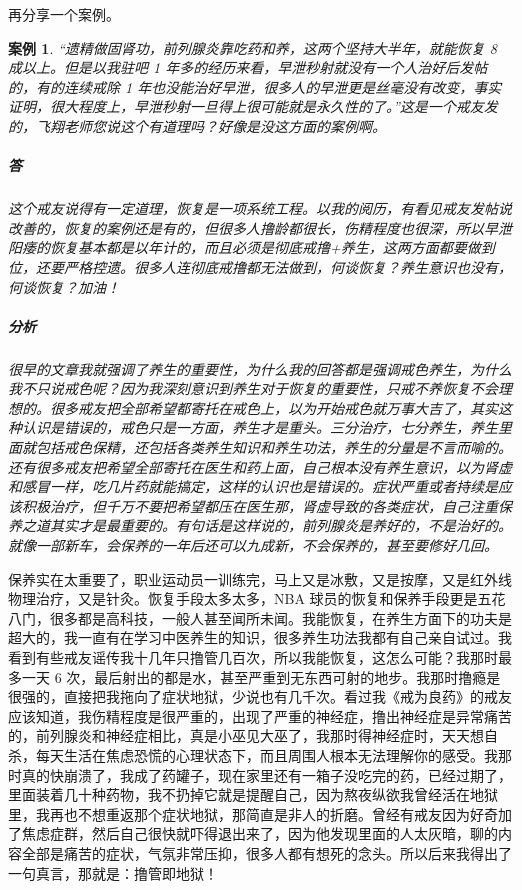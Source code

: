 \documentclass{ctexart}
\newtheorem{case}{案例}
\begin{document}
再分享一个案例。

\begin{case}
    “遗精做固肾功，前列腺炎靠吃药和养，这两个坚持大半年，就能恢复 8 成以上。但是以我驻吧 1 年多的经历来看，早泄秒射就没有一个人治好后发帖的，有的连续戒除 1 年也没能治好早泄，很多人的早泄更是丝毫没有改变，事实证明，很大程度上，早泄秒射一旦得上很可能就是永久性的了。”这是一个戒友发的，飞翔老师您说这个有道理吗？好像是没这方面的案例啊。
    \subparagraph{答} 这个戒友说得有一定道理，恢复是一项系统工程。以我的阅历，有看见戒友发帖说改善的，恢复的案例还是有的，但很多人撸龄都很长，伤精程度也很深，所以早泄阳痿的恢复基本都是以年计的，而且必须是彻底戒撸+养生，这两方面都要做到位，还要严格控遗。很多人连彻底戒撸都无法做到，何谈恢复？养生意识也没有，何谈恢复？加油！
    \subparagraph{分析} 很早的文章我就强调了养生的重要性，为什么我的回答都是强调戒色养生，为什么我不只说戒色呢？因为我深刻意识到养生对于恢复的重要性，只戒不养恢复不会理想的。很多戒友把全部希望都寄托在戒色上，以为开始戒色就万事大吉了，其实这种认识是错误的，戒色只是一方面，养生才是重头。三分治疗，七分养生，养生里面就包括戒色保精，还包括各类养生知识和养生功法，养生的分量是不言而喻的。还有很多戒友把希望全部寄托在医生和药上面，自己根本没有养生意识，以为肾虚和感冒一样，吃几片药就能搞定，这样的认识也是错误的。症状严重或者持续是应该积极治疗，但千万不要把希望都压在医生那，肾虚导致的各类症状，自己注重保养之道其实才是最重要的。有句话是这样说的，前列腺炎是养好的，不是治好的。就像一部新车，会保养的一年后还可以九成新，不会保养的，甚至要修好几回。
\end{case}

保养实在太重要了，职业运动员一训练完，马上又是冰敷，又是按摩，又是红外线物理治疗，又是针灸。恢复手段太多太多，NBA 球员的恢复和保养手段更是五花八门，很多都是高科技，一般人甚至闻所未闻。我能恢复，在养生方面下的功夫是超大的，我一直有在学习中医养生的知识，很多养生功法我都有自己亲自试过。我看到有些戒友谣传我十几年只撸管几百次，所以我能恢复，这怎么可能？我那时最多一天 6 次，最后射出的都是水，甚至严重到无东西可射的地步。我那时撸瘾是很强的，直接把我拖向了症状地狱，少说也有几千次。看过我《戒为良药》的戒友应该知道，我伤精程度是很严重的，出现了严重的神经症，撸出神经症是异常痛苦的，前列腺炎和神经症相比，真是小巫见大巫了，我那时得神经症时，天天想自杀，每天生活在焦虑恐慌的心理状态下，而且周围人根本无法理解你的感受。我那时真的快崩溃了，我成了药罐子，现在家里还有一箱子没吃完的药，已经过期了，里面装着几十种药物，我不扔掉它就是提醒自己，因为熬夜纵欲我曾经活在地狱里，我再也不想重返那个症状地狱，那简直是非人的折磨。曾经有戒友因为好奇加了焦虑症群，然后自己很快就吓得退出来了，因为他发现里面的人太灰暗，聊的内容全部是痛苦的症状，气氛非常压抑，很多人都有想死的念头。所以后来我得出了一句真言，那就是：撸管即地狱！
\end{document}
